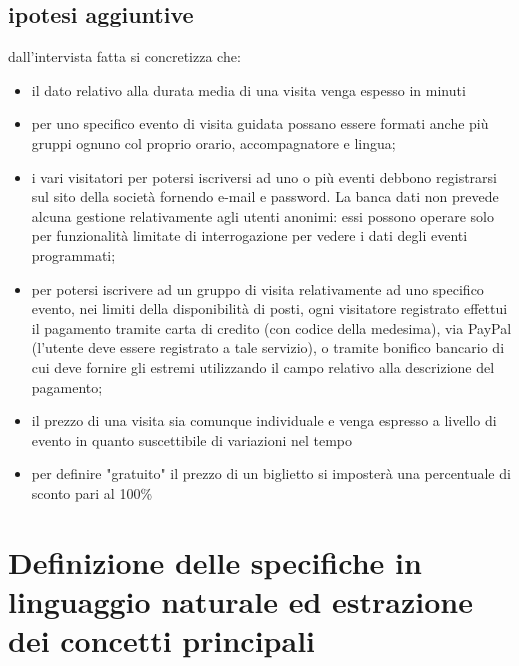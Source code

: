 \documentclass[a4paper,12pt]{report}
\begin{document}
\subsection*{ipotesi aggiuntive}
dall'intervista fatta si concretizza che:
\begin{itemize}
	\item il dato relativo alla durata media di una visita venga espesso in minuti
	\item  per	uno	specifico	evento	di	visita	guidata	possano	essere	formati	anche	più	gruppi		ognuno
	      col	proprio	orario,	accompagnatore	e	lingua;
	\item i	 vari	 visitatori	 per	 potersi	 iscriversi	 ad	 uno	 o	 più	 eventi	 debbono	 registrarsi	 sul	 sito	 della
	      società	 fornendo	 e-mail	 e	 password.	 La	 banca	 dati	 non	 prevede	 alcuna	 gestione
	      relativamente	 agli	 utenti	 anonimi:	 essi	 possono	 operare	 solo	 per	 funzionalità	 limitate	 di
	      interrogazione	per	vedere	i	dati	degli	eventi	programmati;
	\item per	potersi	iscrivere	ad	un	gruppo	di	visita	relativamente	ad	uno	specifico	evento,	nei	limiti
	      della	 disponibilità	 di	 posti,	 ogni	 visitatore	 registrato	 effettui	 il	 pagamento	 tramite	 carta	 di
	      credito	 (con	 codice	 della	 medesima),	 via	 PayPal	 (l’utente	 deve	 essere	 registrato	 a	 tale
	      servizio),	 o	 tramite	 bonifico	 bancario	 di	 cui	 deve	 fornire	 gli	 estremi	 utilizzando	 il	 campo
	      relativo	alla	descrizione	del	pagamento;
	\item il	prezzo	di	una	visita	sia	comunque	individuale	e	venga	espresso	a	livello	di	evento	in	quanto
	      suscettibile	di	variazioni	nel	tempo
	\item per definire "gratuito" il prezzo di un biglietto si imposterà una percentuale di sconto pari al 100\%
\end{itemize}



\section{Definizione delle specifiche in linguaggio naturale ed estrazione dei concetti principali}
\end{document}
